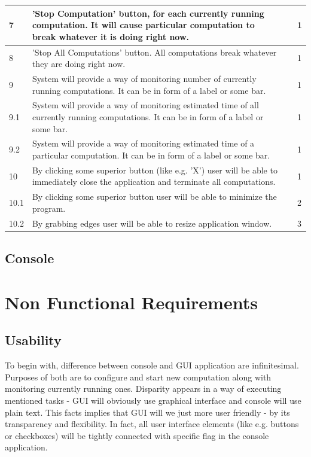 \documentclass{article}
\begin{document}
\begin{center}
\begin{longtable}{| l | p{4cm} | p{3.5cm} | l |}
		7 & 
		'Stop Computation' button, for each currently running computation. It will cause 				particular computation to break whatever it is doing right now. & 
		 &
		1
		\\ \hline	
		
		8 & 
		'Stop All Computations' button. All computations break whatever they are doing right 			now. & 
		 &
		1
		\\ \hline		
		
		9 & 
		System will provide a way of monitoring number of currently running computations. It 			can be in form of a label or some bar. & 
		 &
		1
		\\ \hline	

		9.1 & 
		System will provide a way of monitoring estimated time of all currently running 				computations. It can be in form of a label or some bar. & 
		 &
		1
		\\ \hline

		9.2 & 
		System will provide a way of monitoring estimated time of a particular computation. It 			can be in form of a label or some bar. & 
		 &
		1
		\\ \hline

		10 & 
		By clicking some superior button (like e.g. 'X') user will be able to immediately 				close the application and terminate all computations.  & 
		 &
		1
		\\ \hline
	
		10.1 & 
		By clicking some superior button user will be able to minimize the program. & 
		 &
		2
		\\ \hline	

		10.2 & 
		By grabbing edges user will be able to resize application window. & 
		 &
		3
		\\ \hline
		
	\end{longtable}
\end{center}	

\subsection{Console}


\newpage

\section{Non Functional Requirements}
\subsection{Usability}
To begin with, difference between console and GUI application are infinitesimal. Purposes of both are to configure and start new computation along with monitoring currently running ones.
Disparity appears in a way of executing mentioned tasks - GUI will obviously use graphical interface and console will use plain text. This facts implies that GUI will we just more user friendly - by its transparency and flexibility. In fact, all user interface elements (like e.g. buttons or checkboxes) will be tightly connected with specific flag in the console application.
\end{document}
